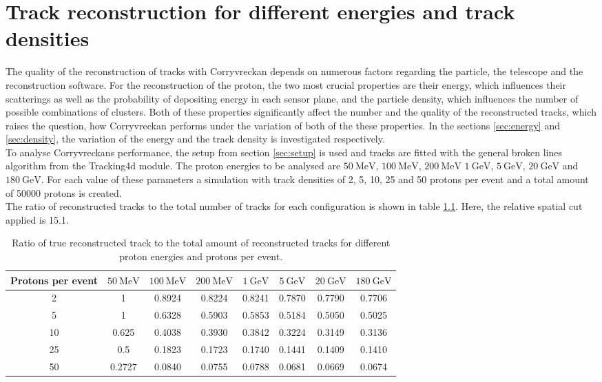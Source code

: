 \chapter{Track reconstruction for different energies and track densities}
The quality of the reconstruction of tracks with Corryvreckan depends on numerous factors regarding the particle, the telescope and the reconstruction software.
For the reconstruction of the proton, the two most crucial properties are their energy, which influences their scatterings as well as the probability of
depositing energy in each sensor plane, and the particle density, which influences the number of possible combinations of clusters.
Both of these properties significantly affect the number and the quality of the reconstructed tracks, which raises the question, how Corryvreckan performs
under the variation of both of the these properties.
In the sections \ref{sec:energy} and \ref{sec:density}, the variation of the energy and the track density is investigated respectively. \\

To analyse Corryvreckans performance, the setup from section \ref{sec:setup} is used and tracks are fitted with the general broken lines algorithm from the Tracking4d module.
The proton energies to be analysed are $\SI{50}{\mega\eV}$, $\SI{100}{\mega\eV}$, $\SI{200}{\mega\eV}$
$\SI{1}{\giga\eV}$, $\SI{5}{\giga\eV}$, $\SI{20}{\giga\eV}$ and $\SI{180}{\giga\eV}$. For each value of these parameters a simulation with track densities
of 2, 5, 10, 25 and 50 protons per event and a total amount of 50000 protons is created. \\
The ratio of reconstructed tracks to the total number of tracks for each configuration is shown in table \ref{tab:study}. Here, the relative spatial cut applied is 15.1.


\begin{table}
  \centering
  \begin{tabular}{c | c c c c c c c}
    \toprule
     Protons per event &  $\SI{50}{\mega\eV}$ & $\SI{100}{\mega\eV}$ & $\SI{200}{\mega\eV}$ & $\SI{1}{\giga\eV}$ & $\SI{5}{\giga\eV}$ & $\SI{20}{\giga\eV}$ & $\SI{180}{\giga\eV}$ \\
    \midrule
     2   & 1 & 0.8924 & 0.8224 & 0.8241 & 0.7870 & 0.7790 & 0.7706  \\
     5   & 1 & 0.6328 & 0.5903 & 0.5853 & 0.5184 & 0.5050 & 0.5025  \\
     10  & 0.625 & 0.4038 & 0.3930 & 0.3842 & 0.3224 & 0.3149 & 0.3136  \\
     25  & 0.5 & 0.1823 & 0.1723 & 0.1740 & 0.1441 & 0.1409 & 0.1410  \\
     50  & 0.2727 & 0.0840 & 0.0755 & 0.0788 & 0.0681 & 0.0669 & 0.0674  \\
  \end{tabular}
  \caption{Ratio of true reconstructed track to the total amount of reconstructed tracks for different proton energies and protons per event.}
  \label{tab:study}
\end{table}


